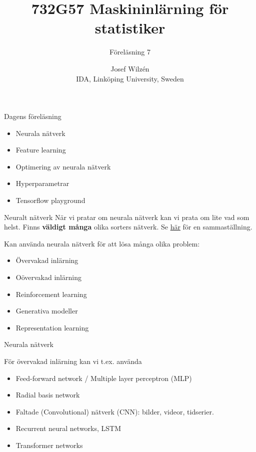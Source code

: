 \documentclass[10pt,english]{beamer}
\title{732G57 Maskininlärning för statistiker}
\subtitle{Föreläsning 7}
\date{}
\author{Josef Wilzén \\ IDA, Linköping University, Sweden}
\begin{document}
\maketitle

\begin{frame}{Dagens föreläsning}

    \begin{itemize}
        \item Neurala nätverk
        \item Feature learning
        \item Optimering av neurala nätverk
        \item Hyperparametrar
        \item Tensorflow playground
    \end{itemize}
    
\end{frame}


\begin{frame}{Neuralt nätverk}
    När vi pratar om neurala nätverk kan vi prata om lite vad som helst. Finns \textbf{väldigt många} olika sorters nätverk. Se \href{https://www.asimovinstitute.org/neural-network-zoo/}{här} för en sammaställning.

    Kan använda neurala nätverk för att lösa många olika problem:
    \begin{itemize}
        \item Övervakad inlärning
        \item Oövervakad inlärning
        \item Reinforcement learning
        \item Generativa modeller
        \item Representation learning
    \end{itemize}

\end{frame}


\begin{frame}{Neurala nätverk}
    
    För övervakad inlärning kan vi t.ex. använda
    \begin{itemize}
        \item Feed-forward network / Multiple layer perceptron (MLP)
        \item Radial basis network
        \item Faltade (Convolutional) nätverk (CNN): bilder, videor, tidserier.
        \item Recurrent neural networks, LSTM
        \item Transformer networks 
    \end{itemize}

\end{frame}
\end{document}
